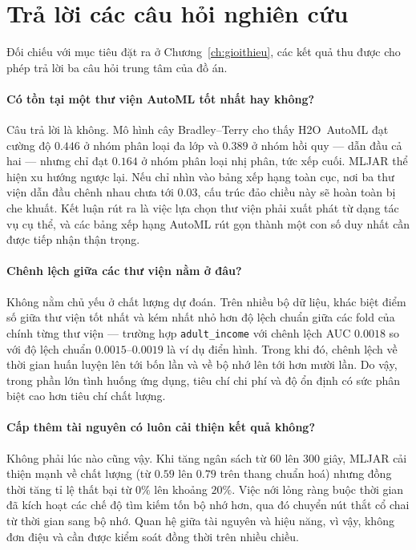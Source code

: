 \section{Trả lời các câu hỏi nghiên cứu}
\label{sec:traloi}
Đối chiếu với mục tiêu đặt ra ở Chương~\ref{ch:gioithieu}, các kết quả thu được
cho phép trả lời ba câu hỏi trung tâm của đồ án.

\paragraph{Có tồn tại một thư viện AutoML tốt nhất hay không?} Câu trả lời là
không. Mô hình cây Bradley--Terry cho thấy H2O~AutoML đạt cường độ $0.446$ ở nhóm
phân loại đa lớp và $0.389$ ở nhóm hồi quy --- dẫn đầu cả hai --- nhưng chỉ đạt
$0.164$ ở nhóm phân loại nhị phân, tức xếp cuối. MLJAR thể hiện xu hướng ngược
lại. Nếu chỉ nhìn vào bảng xếp hạng toàn cục, nơi ba thư viện dẫn đầu chênh nhau
chưa tới $0.03$, cấu trúc đảo chiều này sẽ hoàn toàn bị che khuất. Kết luận rút ra
là việc lựa chọn thư viện phải xuất phát từ dạng tác vụ cụ thể, và các bảng xếp
hạng AutoML rút gọn thành một con số duy nhất cần được tiếp nhận thận trọng.

\paragraph{Chênh lệch giữa các thư viện nằm ở đâu?} Không nằm chủ yếu ở chất lượng
dự đoán. Trên nhiều bộ dữ liệu, khác biệt điểm số giữa thư viện tốt nhất và kém
nhất nhỏ hơn độ lệch chuẩn giữa các fold của chính từng thư viện --- trường hợp
\texttt{adult\_income} với chênh lệch AUC $0.0018$ so với độ lệch chuẩn
$0.0015$--$0.0019$ là ví dụ điển hình. Trong khi đó, chênh lệch về thời gian huấn
luyện lên tới bốn lần và về bộ nhớ lên tới hơn mười lần. Do vậy, trong phần lớn
tình huống ứng dụng, tiêu chí chi phí và độ ổn định có sức phân biệt cao hơn tiêu
chí chất lượng.

\paragraph{Cấp thêm tài nguyên có luôn cải thiện kết quả không?} Không phải lúc
nào cũng vậy. Khi tăng ngân sách từ $60$ lên $300$ giây, MLJAR cải thiện mạnh về
chất lượng (từ $0.59$ lên $0.79$ trên thang chuẩn hoá) nhưng đồng thời tăng tỉ lệ
thất bại từ $0\%$ lên khoảng $20\%$. Việc nới lỏng ràng buộc thời gian đã kích
hoạt các chế độ tìm kiếm tốn bộ nhớ hơn, qua đó chuyển nút thắt cổ chai từ thời
gian sang bộ nhớ. Quan hệ giữa tài nguyên và hiệu năng, vì vậy, không đơn điệu và
cần được kiểm soát đồng thời trên nhiều chiều.

